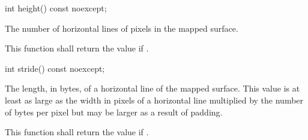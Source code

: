 \begin{itemdecl}
    int height() const noexcept;
\end{itemdecl}
\begin{itemdescr}
	\pnum
	\returns
	The number of horizontal lines of pixels in the mapped surface.
	
	\pnum
	\remarks
	This function shall return the value  if .
	
\end{itemdescr}

\begin{itemdecl}
    int stride() const noexcept;
\end{itemdecl}
\begin{itemdescr}
	\pnum
	\returns
	The length, in bytes, of a horizontal line of the mapped surface. This value is at least as large as the width in pixels of a horizontal line multiplied by the number of bytes per pixel but may be larger as a result of padding.
	
	\pnum
	\remarks
	This function shall return the value  if .
	
\end{itemdescr}

